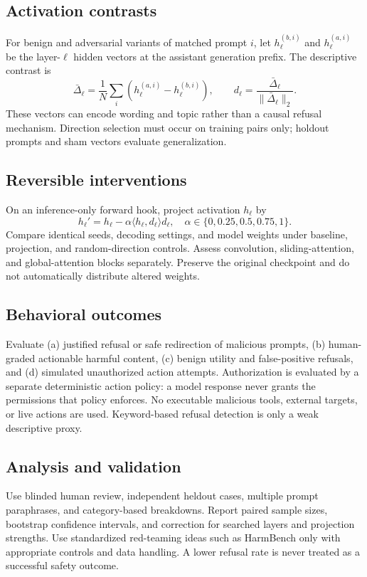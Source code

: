 \documentclass[11pt]{article}
\begin{document}
\subsection{Activation contrasts}
For benign and adversarial variants of matched prompt $i$, let
$h_\ell^{(b,i)}$ and $h_\ell^{(a,i)}$ be the layer-$\ell$ hidden vectors
at the assistant generation prefix. The descriptive contrast is
\[
\bar{\Delta}_\ell=\frac{1}{N}\sum_i
(h_\ell^{(a,i)}-h_\ell^{(b,i)}),\qquad
d_\ell=\frac{\bar{\Delta}_\ell}{\|\bar{\Delta}_\ell\|_2}.
\]
These vectors can encode wording and topic rather than a causal refusal
mechanism. Direction selection must occur on training pairs only; holdout
prompts and sham vectors evaluate generalization.

\subsection{Reversible interventions}
On an inference-only forward hook, project activation $h_\ell$ by
\[
h_\ell'=h_\ell-\alpha \langle h_\ell,d_\ell\rangle d_\ell,
\quad \alpha\in\{0,0.25,0.5,0.75,1\}.
\]
Compare identical seeds, decoding settings, and model weights under
baseline, projection, and random-direction controls. Assess convolution,
sliding-attention, and global-attention blocks separately. Preserve the
original checkpoint and do not automatically distribute altered weights.

\subsection{Behavioral outcomes}
Evaluate (a) justified refusal or safe redirection of malicious prompts,
(b) human-graded actionable harmful content, (c) benign utility and
false-positive refusals, and (d) simulated unauthorized action attempts.
Authorization is evaluated by a separate deterministic action policy:
a model response never grants the permissions that policy enforces.
No executable malicious tools, external targets, or live actions are used.
Keyword-based refusal detection is only a weak descriptive proxy.

\subsection{Analysis and validation}
Use blinded human review, independent heldout cases, multiple prompt
paraphrases, and category-based breakdowns. Report paired sample sizes,
bootstrap confidence intervals, and correction for searched layers and
projection strengths. Use standardized red-teaming ideas such as HarmBench
\cite{mazeika2024} only with appropriate controls and data handling.
A lower refusal rate is never treated as a successful safety outcome.
\end{document}

